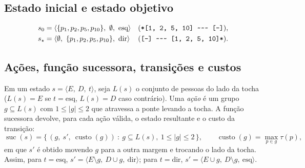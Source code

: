 \documentclass[12pt,a4paper]{article}
\newcommand{\cost}{\operatorname{custo}}
\newcommand{\Esq}{E}
\newcommand{\Dir}{D}
\newcommand{\state}[3]{\langle #1,\ #2,\ #3\rangle}
\begin{document}

\subsection{Estado inicial e estado objetivo}
\label{sec:inicial-objetivo}

\begin{align}
  s_0 &= \state{\{p_1,p_2,p_5,p_{10}\}}{\emptyset}{\text{esq}}
       &&\text{(\texttt{*[1, 2, 5, 10] \textasciitilde\textasciitilde\textasciitilde{} [-]})}, \label{eq:inicial}\\
  s_\star &= \state{\emptyset}{\{p_1,p_2,p_5,p_{10}\}}{\text{dir}}
       &&\text{(\texttt{[-] \textasciitilde\textasciitilde\textasciitilde{} [1, 2, 5, 10]*})}. \label{eq:objetivo}
\end{align}


\subsection{Ações, função sucessora, transições e custos}
\label{sec:sucessora}

Em um estado $s = \state{\Esq}{\Dir}{t}$, seja $L(s)$ o conjunto de pessoas do lado da tocha ($L(s)=\Esq$ se $t=\text{esq}$, $L(s)=\Dir$ caso contrário). Uma \emph{ação} é um grupo $g \subseteq L(s)$ com $1 \le |g| \le 2$ que atravessa a ponte levando a tocha. A função sucessora devolve, para cada ação válida, o estado resultante e o custo da transição:
\begin{equation}
  \operatorname{suc}(s) = \bigl\{\, (g,\ s',\ \cost(g)) \ :\ g \subseteq L(s),\ 1 \le |g| \le 2 \,\bigr\},
  \qquad
  \cost(g) = \max_{p \in g} \tau(p),
  \label{eq:sucessora}
\end{equation}
em que $s'$ é obtido movendo $g$ para a outra margem e trocando o lado da tocha. Assim, para $t=\text{esq}$, $s' = \state{\Esq \setminus g}{\Dir \cup g}{\text{dir}}$; para $t=\text{dir}$, $s' = \state{\Esq \cup g}{\Dir \setminus g}{\text{esq}}$.
\end{document}
